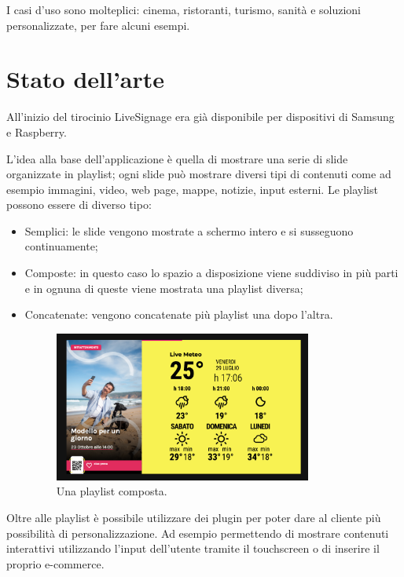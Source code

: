 I casi d'uso sono molteplici: cinema, ristoranti, turismo, sanità e soluzioni personalizzate, per fare alcuni esempi. 

\section{Stato dell'arte}

All'inizio del tirocinio LiveSignage era già disponibile per dispositivi di Samsung e Raspberry.  

L'idea alla base dell'applicazione è quella di mostrare una serie di slide organizzate in playlist; ogni slide può mostrare diversi tipi di contenuti come ad esempio immagini, video, web page, mappe, notizie, input esterni. Le playlist possono essere di diverso tipo:

\begin{itemize}
    \item Semplici: le slide vengono mostrate a schermo intero e si susseguono continuamente;
    \item Composte: in questo caso lo spazio a disposizione viene suddiviso in più parti e in ognuna di queste viene mostrata una playlist diversa;
    \item Concatenate: vengono concatenate più playlist una dopo l'altra.
    \begin{figure}[!htb]
        \centering
        \includegraphics[width= 0.8\textwidth]{images/Introduzione/playlist-composta.png} 
        \caption{Una playlist composta.} 
    \end{figure}
\end{itemize}


Oltre alle playlist è possibile utilizzare dei plugin per poter dare al cliente più possibilità di personalizzazione. Ad esempio permettendo di  mostrare contenuti interattivi utilizzando l'input dell'utente tramite il touchscreen o di inserire il proprio e-commerce.

